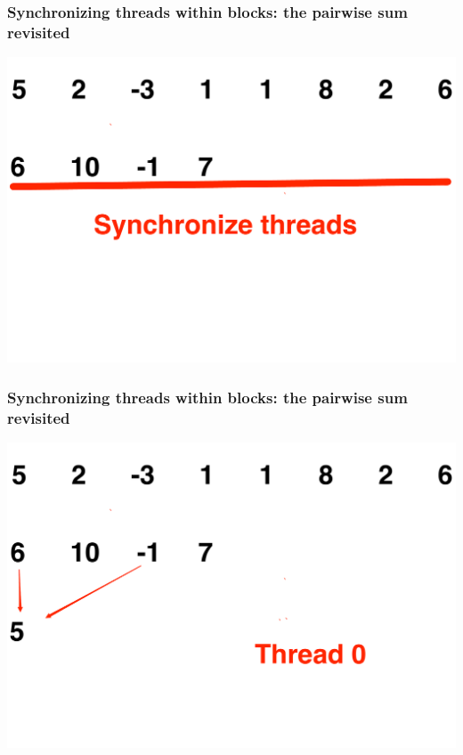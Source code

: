 \documentclass[handout]{beamer}
\numberwithin{equation}{section}
\begin{document}
\begin{frame}
\frametitle{Synchronizing threads within blocks: the pairwise sum revisited}
 \begin{center}
\includegraphics[scale = .25]{../../fig/psum5}
\end{center}
\end{frame}

\begin{frame}
\frametitle{Synchronizing threads within blocks: the pairwise sum revisited}
\begin{center}
\includegraphics[scale = .25]{../../fig/psum6}
\end{center}
\end{frame}
\end{document}
